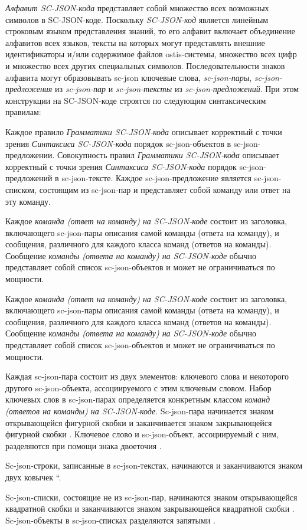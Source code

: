 \textit{Алфавит SC-JSON-кода\scnsupergroupsign} представляет собой множество всех возможных символов в SC-JSON-коде.
Поскольку \textit{SC-JSON-код} является линейным строковым языком представления знаний, то его алфавит включает
объединение алфавитов всех языков, тексты на которых могут представлять внешние идентификаторы и/или содержимое файлов ostis-системы,
множество всех цифр и множество всех других специальных символов. Последовательности знаков алфавита могут образовывать
sc-json ключевые слова, \textit{sc-json-пары}, \textit{sc-json-предложения} из \textit{sc-json-пар} и
\textit{sc-json-тексты} из \textit{sc-json-предложений}. При этом конструкции на SC-JSON-коде строятся по следующим
синтаксическим правилам:
\begin{scnitemize}
    \item Каждое правило \textit{Грамматики SC-JSON-кода} описывает корректный с точки зрения \textit{Синтаксиса
    SC-JSON-кода} порядок sc-json-объектов в sc-json-предложении. Совокупность правил \textit{Грамматики SC-JSON-кода}
    описывает корректный с точки зрения \textit{Синтаксиса SC-JSON-кода} порядок sc-json-предложений в sc-json-тексте.
    Каждое sc-json-предложение является sc-json-списком, состоящим из sc-json-пар и представляет собой команду или ответ
    на эту команду.
    \item Каждое \textit{команда (ответ на команду) на SC-JSON-коде} состоит из заголовка, включающего sc-json-пары
    описания самой команды (ответа на команду), и сообщения, различного для каждого класса команд (ответов на команды).
    Сообщение \textit{команды (ответа на команду) на SC-JSON-коде} обычно представляет собой список sc-json-объектов и
    может не ограничиваться по мощности.
    \item Каждое \textit{команда (ответ на команду) на SC-JSON-коде} состоит из заголовка, включающего sc-json-пары
    описания самой команды (ответа на команду), и сообщения, различного для каждого класса команд (ответов на команды).
    Сообщение \textit{команды (ответа на команду) на SC-JSON-коде} обычно представляет собой список sc-json-объектов и
    может не ограничиваться по мощности.
    \item Каждая sc-json-пара состоит из двух элементов: ключевого слова и некоторого другого sc-json-объекта,
    ассоциируемого с этим ключевым словом. Набор ключевых слов в sc-json-парах определяется конкретным классом
    \textit{команд (ответов на команды) на SC-JSON-коде}. Sc-json-пара начинается знаком открывающейся фигурной скобки
    \scnqq{\{} и заканчивается знаком закрывающейся фигурной скобки \scnqq{\}}. Ключевое слово и sc-json-объект,
    ассоциируемый с ним, разделяются при помощи знака двоеточия \scnqq{:}.
    \item Sc-json-строки, записанные в sc-json-текстах, начинаются и заканчиваются знаком двух ковычек \textquotedblleft.
    \item Sc-json-списки, состоящие не из sc-json-пар, начинаются знаком открывающейся квадратной скобки \scnqq{[} и
    заканчиваются знаком закрывающейся квадратной скобки \scnqq{]}. Sc-json-объекты в sc-json-списках разделяются
    запятыми \scnqq{,}.
\end{scnitemize}

